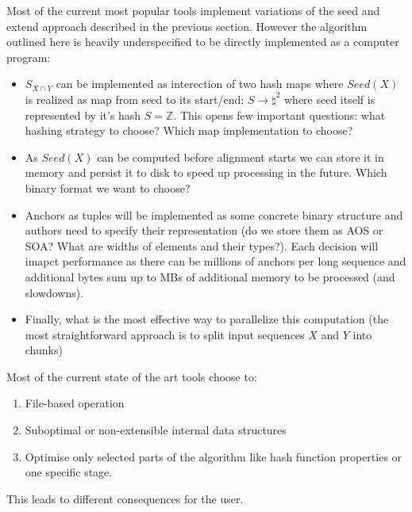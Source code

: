 Most of the current most popular tools implement variations of the seed and extend approach described in the previous section. However the algorithm outlined here is heavily underspecified to be directly implemented as a computer program:
\begin{itemize}
  \item $S_{X \cap Y}$ can be implemented as interection of two hash maps where $Seed(X)$ is realized as map from seed to its start/end: $S \rightarrow \natural^2$ where seed itself is represented by it's hash $S = \mathbb{Z}$. This opens few important questions: what hashing strategy to choose? Which map implementation to choose?
  \item As $Seed(X)$ can be computed before alignment starts we can store it in memory and persist it to disk to speed up processing in the future. Which binary format we want to choose?
  \item Anchors as tuples will be implemented as some concrete binary structure and authors need to specify their representation (do we store them as AOS or SOA? What are widths of elements and their types?). Each decision will imapct performance as there can be millions of anchors per long sequence and additional bytes sum up to MBs of additional memory to be processed (and slowdowns).
  \item Finally, what is the most effective way to parallelize this computation (the most straightforward approach is to split input sequences $X$ and $Y$ into chunks)
\end{itemize}

Most of the current state of the art tools choose to:
\begin{enumerate}
  \item File-based operation
  \item Suboptimal or non-extensible internal data structures
  \item Optimise only selected parts of the algorithm like hash function properties or one specific stage.
\end{enumerate}
This leads to different consequences for the user.

